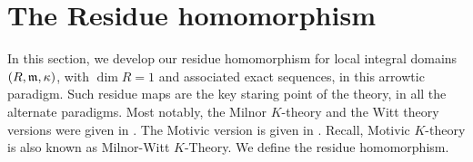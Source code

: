 \documentclass[12pt]{article}
\begin{document}



\section{The Residue homomorphism}\label{secResidue} 
In this section, we develop our residue homomorphism for 
local integral domains $\left( R, \mathfrak {m}, \kappa\right)$, with $\dim R=1$ and associated exact sequences, 
in this arrowtic paradigm. Such residue maps are the key staring point of the theory,
 in all the alternate paradigms. Most notably,  
the Milnor $K$-theory  and the Witt theory versions were given in   \cite[Lem 2.2, Thm 2.3, Cor 5.1, Thm 5.3]{M69}. 
The Motivic version is given in \cite[pp 55, Thm 3.24]{M12}. Recall, Motivic $K$-theory is  also known as Milnor-Witt $K$-Theory. We define the residue homomorphism.
\end{document}
